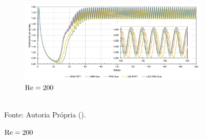 \begin{figure}[h!]
\begin{subfigure}{\textwidth}
        \includegraphics[width=\linewidth]{Figuras/cylinder/analise3/Cd-200.pdf}
        \caption{$\mathrm{Re}=200$}
    \end{subfigure}
    \\Fonte: Autoria Própria (\the\year).
    \label{fig:cyl-Cd}
\end{figure}
\newpage

